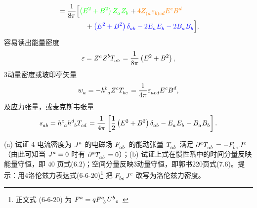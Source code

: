 \begin{xiti}
\begin{zm}
\begin{tcolorbox}[breakable,title=补充,fonttitle=\normalfont\bfseries]
\begin{equation*}
\begin{split}
						&= \frac{1}{8\pi} \Big[ {\color{green} \left( E^2 + B^2 \right) \tensor{Z}{_a} \tensor{Z}{_b}} + {\color{orange} 4 \tensor{Z}{_{(a}} \tensor{\varepsilon}{_{b)}_c_d} \tensor{E}{^c} \tensor{B}{^d}} \\
						&\qquad\qquad {}+ {\color{blue} \left( E^2 + B^2 \right) \tensor{\delta}{_a_b} - 2 \tensor{E}{_a} \tensor{E}{_b} - 2 \tensor{B}{_a} \tensor{B}{_b}} \Big],
					\end{split}
				\end{equation*}
				容易读出能量密度
				\begin{equation*}
					\varepsilon = \tensor{Z}{^a} \tensor{Z}{^b} \tensor{T}{_a_b} = \frac{1}{8\pi} \left( E^2 + B^2 \right),
				\end{equation*}
				3动量密度或玻印亭矢量
				\begin{equation*}
					\tensor{w}{_a} = - \tensor{h}{^b_a} \tensor{Z}{^c} \tensor{T}{_b_c} = \frac{1}{4\pi} \tensor{\varepsilon}{_a_c_d} \tensor{E}{^c} \tensor{B}{^d},
				\end{equation*}
				及应力张量，或麦克斯韦张量
				\begin{equation*}
					\tensor{s}{_a_b} = \tensor{h}{^c_a} \tensor{h}{^d_b} \tensor{T}{_c_d} = \frac{1}{4\pi} \left[ \frac{1}{2} \left( E^2 + B^2 \right) \tensor{\delta}{_a_b} - \tensor{E}{_a} \tensor{E}{_b} - \tensor{B}{_a} \tensor{B}{_b} \right].
				\end{equation*}
			\end{tcolorbox}
		\end{zm}

	\item (a) 试证 4 电流密度为 $\tensor{J}{^a}$ 的电磁场 $\tensor{F}{_a_b}$ 的能动张量 $\tensor{T}{_a_b}$ 满足 $\tensor{\partial}{^a} \tensor{T}{_a_b} = - \tensor{F}{_b_c} \tensor{J}{^c}$（由此可知当 $\tensor{J}{^a}=0$ 时有 $\tensor{\partial}{^a} \tensor{T}{_a_b} = 0$）；(b) 试证上式在惯性系中的时间分量反映能量守恒，即\cite{guo1995} 40 页式(6.2)；空间分量反映3动量守恒，即郭书220页式(7.6)。提示：用4洛伦兹力表达式(6-6-20)\footnote{正文式 (6-6-20) 为 $\tensor{F}{^a} = q \tensor{F}{^a_b} \tensor{U}{^b}$。} 把 $\tensor{F}{_b_c} \tensor{J}{^c}$ 改写为洛伦兹力密度。


\end{xiti}
